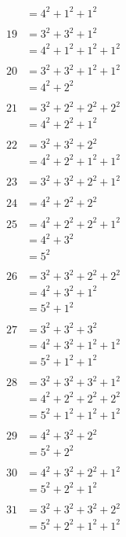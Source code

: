 \documentclass{article}
\numberwithin{equation}{section}
\begin{document}
\begin{multicols}{3}
\begin{align*}
   & = 4^2 + 1^2 + 1^2\\
\\
19 & = 3^2 + 3^2 + 1^2\\
   & = 4^2 + 1^2 + 1^2 + 1^2\\
\\
20 & = 3^2 + 3^2 + 1^2 + 1^2\\
   & = 4^2 + 2^2\\
\\
21 & = 3^2 + 2^2 + 2^2 + 2^2\\
   & = 4^2 + 2^2 + 1^2\\
\\
22 & = 3^2 + 3^2 + 2^2\\
   & = 4^2 + 2^2 + 1^2 + 1^2\\
\\
23 & = 3^2 + 3^2 + 2^2 + 1^2\\
\\
24 & = 4^2 + 2^2 + 2^2\\
\\
25 & = 4^2 + 2^2 + 2^2 + 1^2\\
   & = 4^2 + 3^2\\
   & = 5^2\\
\\
26 & = 3^2 + 3^2 + 2^2 + 2^2\\
   & = 4^2 + 3^2 + 1^2\\
   & = 5^2 + 1^2\\
\end{align*}
\vspace{\fill}\columnbreak
\begin{align*}
27 & = 3^2 + 3^2 + 3^2\\
   & = 4^2 + 3^2 + 1^2 + 1^2\\
   & = 5^2 + 1^2 + 1^2\\
\\
28 & = 3^2 + 3^2 + 3^2 + 1^2\\
   & = 4^2 + 2^2 + 2^2 + 2^2\\
   & = 5^2 + 1^2 + 1^2 + 1^2\\
\\
29 & = 4^2 + 3^2 + 2^2\\
   & = 5^2 + 2^2\\
\\
30 & = 4^2 + 3^2 + 2^2 + 1^2\\
   & = 5^2 + 2^2 + 1^2\\
\\
31 & = 3^2 + 3^2 + 3^2 + 2^2\\
   & = 5^2 + 2^2 + 1^2 + 1^2\\

\end{align*}
\end{multicols}
\end{document}

